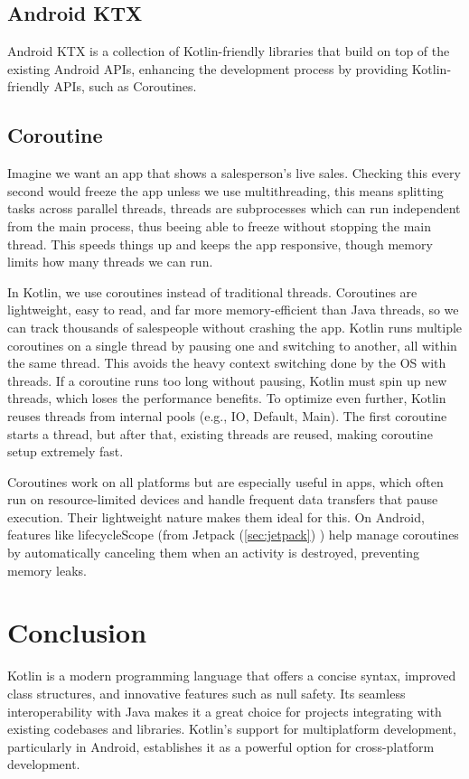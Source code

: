 \documentclass[a4paper,11pt]{article}
\begin{document}
\subsection{Android KTX}
Android KTX is a collection of Kotlin-friendly libraries that build on top of the existing Android APIs, enhancing the development process by providing Kotlin-friendly APIs, such as Coroutines.

\subsection{Coroutine}
Imagine we want an app that shows a salesperson’s live sales. Checking this every second would freeze the app unless we use multithreading, this means splitting tasks across parallel threads, threads are subprocesses which can run independent from the main process, thus beeing able to freeze without stopping the main thread. This speeds things up and keeps the app responsive, though memory limits how many threads we can run.

In Kotlin, we use coroutines instead of traditional threads. Coroutines are lightweight, easy to read, and far more memory-efficient than Java threads, so we can track thousands of salespeople without crashing the app.
Kotlin runs multiple coroutines on a single thread by pausing one and switching to another, all within the same thread. This avoids the heavy context switching done by the OS with threads. If a coroutine runs too long without pausing, Kotlin must spin up new threads, which loses the performance benefits. To optimize even further, Kotlin reuses threads from internal pools (e.g., IO, Default, Main). The first coroutine starts a thread, but after that, existing threads are reused, making coroutine setup extremely fast.

Coroutines work on all platforms but are especially useful in apps, which often run on resource-limited devices and handle frequent data transfers that pause execution. Their lightweight nature makes them ideal for this.
On Android, features like lifecycleScope (from Jetpack (\autoref{sec:jetpack}) ) help manage coroutines by automatically canceling them when an activity is destroyed, preventing memory leaks.
\section{Conclusion}
Kotlin is a modern programming language that offers a concise syntax, improved class structures, and innovative features such as null safety. Its seamless interoperability with Java makes it a great choice for projects integrating with existing codebases and libraries. Kotlin's support for multiplatform development, particularly in Android, establishes it as a powerful option for cross-platform development.
\end{document}
